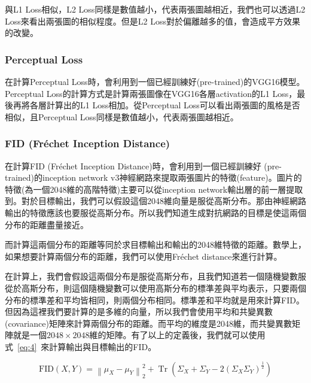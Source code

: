 \documentclass[a4paper, 12pt]{article}
\begin{document}
與L1 Loss相似，L2 Loss同樣是數值越小，代表兩張圖越相近，我們也可以透過L2 Loss來看出兩張圖的相似程度。但是L2 Loss對於偏離越多的值，會造成平方效果的改變。

\subsubsection{Perceptual Loss}

在計算Perceptual Loss\cite{zhang2018perceptual}時，會利用到一個已經訓練好(pre-trained)的VGG16模型。Perceptual Loss的計算方式是計算兩張圖像在VGG16各層activation的L1 Loss，最後再將各層計算出的L1 Loss相加。從Perceptual Loss可以看出兩張圖的風格是否相似，且Perceptual Loss同樣是數值越小，代表兩張圖越相近。

\subsubsection{FID (Fréchet Inception Distance)}
在計算FID (Fréchet Inception Distance)\cite{DOWSON1982450}時，會利用到一個已經訓練好 (pre-trained)的inception network v3神經網路來提取兩張圖片的特徵(feature)。圖片的特徵(為一個2048維的高階特徵)主要可以從inception network輸出層的前一層提取到。對於目標輸出，我們可以假設這個2048維向量是服從高斯分布。那由神經網路輸出的特徵應該也要服從高斯分布。所以我們知道生成對抗網路的目標是使這兩個分布的距離盡量接近。

而計算這兩個分布的距離等同於求目標輸出和輸出的2048維特徵的距離。數學上，如果想要計算兩個分布的距離，我們可以使用Fréchet distance來進行計算。

在計算上，我們會假設這兩個分布是服從高斯分布，且我們知道若一個隨機變數服從於高斯分布，則這個隨機變數可以使用高斯分布的標準差與平均表示，只要兩個分布的標準差和平均皆相同，則兩個分布相同。標準差和平均就是用來計算FID。但因為這裡我們要計算的是多維的向量，所以我們會使用平均和共變異數(covariance)矩陣來計算兩個分布的距離。而平均的維度是2048維，而共變異數矩陣就是一個$2048 \times 2048$維的矩陣。有了以上的定義後，我們就可以使用式~\ref{eq:4}~來計算輸出與目標輸出的FID。


\begin{equation}
    \mathrm{FID}(X, Y)=\left\|\mu_{X}-\mu_{Y}\right\|_{2}^{2}+\operatorname{Tr}\left(\Sigma_{X}+\Sigma_{Y}-2\left(\Sigma_{X} \Sigma_{Y}\right)^{\frac{1}{2}}\right)
    \label{eq:4}
\end{equation}
\end{document}

